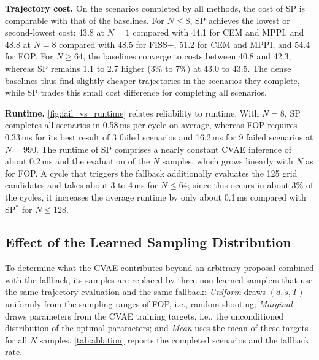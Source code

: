 \textbf{Trajectory cost.}
On the scenarios completed by all methods, the cost of SP is comparable with that of the baselines.
For $N\leq8$, SP achieves the lowest or second-lowest cost: 43.8 at $N=1$ compared with 44.1 for CEM and MPPI, and 48.8 at $N=8$ compared with 48.5 for FISS+, 51.2 for CEM and MPPI, and 54.4 for FOP.
For $N\geq64$, the baselines converge to costs between 40.8 and 42.3, whereas SP remains 1.1 to 2.7 higher (3\% to 7\%) at 43.0 to 43.5.
The dense baselines thus find slightly cheaper trajectories in the scenarios they complete, while SP trades this small cost difference for completing all scenarios.

\textbf{Runtime.}
\autoref{fig:fail_vs_runtime} relates reliability to runtime.
With $N=8$, SP completes all scenarios in 0.58\,ms per cycle on average, whereas FOP requires 0.33\,ms for its best result of 3 failed scenarios and 16.2\,ms for 9 failed scenarios at $N=990$.
The runtime of SP comprises a nearly constant CVAE inference of about 0.2\,ms and the evaluation of the $N$ samples, which grows linearly with $N$ as for FOP.
A cycle that triggers the fallback additionally evaluates the 125 grid candidates and takes about 3 to 4\,ms for $N\leq64$; since this occurs in about 3\% of the cycles, it increases the average runtime by only about 0.1\,ms compared with SP$^{*}$ for $N\leq128$.

\subsection{Effect of the Learned Sampling Distribution}
\label{subsec:ablation}
To determine what the CVAE contributes beyond an arbitrary proposal combined with the fallback, its samples are replaced by three non-learned samplers that use the same trajectory evaluation and the same fallback:
\emph{Uniform} draws $(d,\dot{s},T)$ uniformly from the sampling ranges of FOP, i.e., random shooting;
\emph{Marginal} draws parameters from the CVAE training targets, i.e., the unconditioned distribution of the optimal parameters;
and \emph{Mean} uses the mean of these targets for all $N$ samples.
\autoref{tab:ablation} reports the completed scenarios and the fallback rate.

